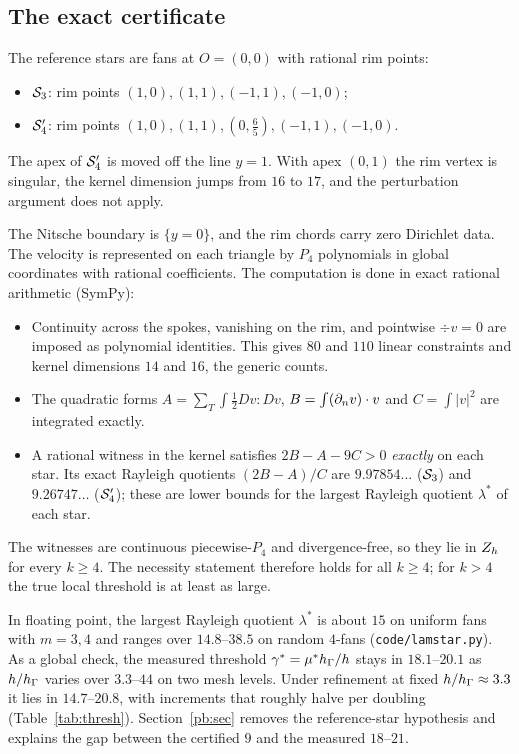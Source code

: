 \subsection*{The exact certificate}
The reference stars are fans at $O=(0,0)$ with rational rim points:
\begin{itemize}
\item $\mathcal S_3$: rim points $(1,0),(1,1),(-1,1),(-1,0)$;
\item $\mathcal S_4'$: rim points $(1,0),(1,1),(0,\tfrac65),(-1,1),(-1,0)$.
\end{itemize}
The apex of $\mathcal S_4'$ is moved off the line $y=1$. With apex $(0,1)$ the rim vertex is singular, the kernel dimension jumps from $16$ to $17$, and the perturbation argument does not apply.

The Nitsche boundary is $\{y=0\}$, and the rim chords carry zero Dirichlet data. The velocity is represented on each triangle by $P_4$ polynomials in global coordinates with rational coefficients. The computation is done in exact rational arithmetic (SymPy):
\begin{itemize}
\item Continuity across the spokes, vanishing on the rim, and pointwise $\div v=0$ are imposed as polynomial identities. This gives $80$ and $110$ linear constraints and kernel dimensions $14$ and $16$, the generic counts.
\item The quadratic forms $A=\sum_T\int\frac12Dv:Dv$, $B=\int(\partial_n v)\cdot v$ and $C=\int|v|^2$ are integrated exactly.
\item A rational witness in the kernel satisfies $2B-A-9C>0$ \emph{exactly} on each star. Its exact Rayleigh quotients $(2B-A)/C$ are $9.97854\ldots$ ($\mathcal S_3$) and $9.26747\ldots$ ($\mathcal S_4'$); these are lower bounds for the largest Rayleigh quotient $\lambda^\ast$ of each star.
\end{itemize}
The witnesses are continuous piecewise-$P_4$ and divergence-free, so they lie in $Z_h$ for every $k\ge4$. The necessity statement therefore holds for all $k\ge4$; for $k>4$ the true local threshold is at least as large.

In floating point, the largest Rayleigh quotient $\lambda^\ast$ is about $15$ on uniform fans with $m=3,4$ and ranges over $14.8$--$38.5$ on random $4$-fans (\texttt{code/lamstar.py}). As a global check, the measured threshold $\gamma^\ast=\mu^\ast h_\Gamma/h$ stays in $18.1$--$20.1$ as $h/h_\Gamma$ varies over $3.3$--$44$ on two mesh levels. Under refinement at fixed $h/h_\Gamma\approx3.3$ it lies in $14.7$--$20.8$, with increments that roughly halve per doubling (Table~\ref{tab:thresh}). Section~\ref{pb:sec} removes the reference-star hypothesis and explains the gap between the certified $9$ and the measured $18$--$21$.

